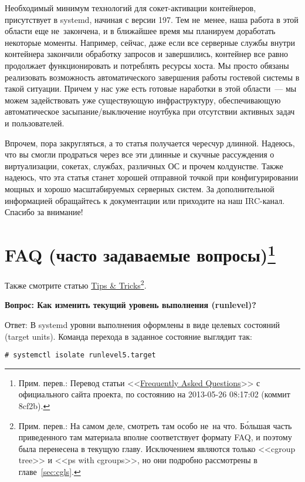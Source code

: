 \documentclass[10pt,oneside,a4paper]{article}
\newcommand{\sfnote}[1]{\texorpdfstring{\protect\footnote%
	{Прим. перев.: #1}}{}}
\newcommand{\qna}[1]{\medskip\par\textbf{Вопрос: #1}\par Ответ:}
\begin{document}
Необходимый минимум технологий для сокет-активации контейнеров, присутствует в
systemd, начиная с версии 197. Тем не~менее, наша работа в этой области еще
не~закончена, и в ближайшее время мы планируем доработать некоторые моменты.
Например, сейчас, даже если все серверные службы внутри контейнера
закончили обработку запросов и завершились, контейнер все равно продолжает
функционировать и потреблять ресурсы хоста. Мы просто обязаны реализовать
возможность автоматического завершения работы гостевой системы в такой ситуации.
Причем у нас уже есть готовые наработки в этой области~--- мы можем
задействовать уже существующую инфраструктуру, обеспечивающую автоматическое
засыпание/выключение ноутбука при отсутствии активных задач и пользователей.

Впрочем, пора закругляться, а то статья получается чересчур длинной. Надеюсь,
что вы смогли продраться через все эти длинные и скучные рассуждения о
виртуализации, сокетах, службах, различных ОС и прочем колдунстве. Также
надеюсь, что эта статья станет хорошей отправной точкой при конфигурировании
мощных и хорошо масштабируемых серверных систем. За дополнительной информацией
обращайтесь к документации или приходите на наш IRC-канал. Спасибо за внимание!

\appendix

\section{FAQ (часто задаваемые вопросы)\sfnote{Перевод статьи
<<\href{http://www.freedesktop.org/wiki/Software/systemd/FrequentlyAskedQuestions}%
{Frequently Asked Questions}>> с официального сайта проекта, по состоянию на
2013-05-26 08:17:02 (коммит 8cf2b).}}

Также смотрите статью
\href{http://www.freedesktop.org/wiki/Software/systemd/TipsAndTricks}{Tips \&
Tricks}\footnote{Прим. перев.: На самом деле, смотреть там особо не~на что.
Б\'{о}льшая часть приведенного там материала вполне соответствует формату FAQ, и
поэтому была перенесена в текущую главу. Исключением являются только
<<cgroup tree>> и <<ps with cgroups>>, но они подробно рассмотрены в
главе~\ref{sec:cgls}.}.

\qna{Как изменить текущий уровень выполнения (runlevel)?}
В systemd уровни выполнения оформлены в виде целевых состояний (target units).
Команда перехода в заданное состояние выглядит так:
\begin{Verbatim}
# systemctl isolate runlevel5.target
\end{Verbatim}
\end{document}
